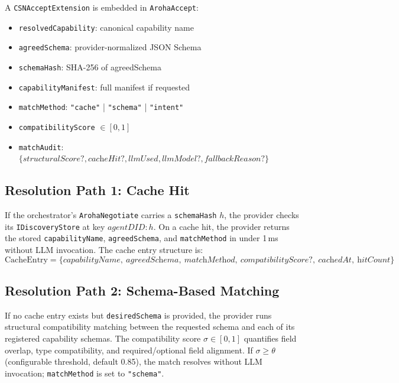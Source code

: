 \documentclass[conference]{IEEEtran}
\begin{document}
A \texttt{CSNAcceptExtension} is embedded in \texttt{ArohaAccept}:
\begin{itemize}
  \item \texttt{resolvedCapability}: canonical capability name
  \item \texttt{agreedSchema}: provider-normalized JSON Schema
  \item \texttt{schemaHash}: SHA-256 of agreedSchema
  \item \texttt{capabilityManifest}: full manifest if requested
  \item \texttt{matchMethod}: \texttt{"cache"} | \texttt{"schema"} |
        \texttt{"intent"}
  \item \texttt{compatibilityScore} $\in [0,1]$
  \item \texttt{matchAudit}: $\{\textit{structuralScore}?,
        \textit{cacheHit}?, \textit{llmUsed}, \textit{llmModel}?,
        \textit{fallbackReason}?\}$
\end{itemize}

\subsection{Resolution Path 1: Cache Hit}

If the orchestrator's \texttt{ArohaNegotiate} carries a
\texttt{schemaHash} $h$, the provider checks its
\texttt{IDiscoveryStore} at key $\textit{agentDID}\!:\!h$.  On a
cache hit, the provider returns the stored \texttt{capabilityName},
\texttt{agreedSchema}, and \texttt{matchMethod} in under 1\,ms
without LLM invocation.  The cache entry structure is:
\[
  \text{CacheEntry} = \{\textit{capabilityName},\ \textit{agreedSchema},\
  \textit{matchMethod},\ \textit{compatibilityScore}?,\
  \textit{cachedAt},\ \textit{hitCount}\}
\]

\subsection{Resolution Path 2: Schema-Based Matching}

If no cache entry exists but \texttt{desiredSchema} is provided,
the provider runs structural compatibility matching between the
requested schema and each of its registered capability schemas.
The compatibility score $\sigma \in [0,1]$ quantifies field overlap,
type compatibility, and required/optional field alignment.
If $\sigma \geq \theta$ (configurable threshold, default 0.85),
the match resolves without LLM invocation; \texttt{matchMethod}
is set to \texttt{"schema"}.
\end{document}
